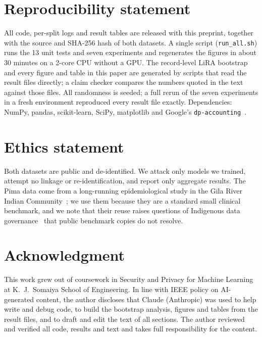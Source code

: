 \documentclass[conference]{IEEEtran}
\begin{document}
\section*{Reproducibility statement}
All code, per-split logs and result tables are released with this preprint, together with the source and SHA-256 hash of both datasets. A single script (\texttt{run\_all.sh}) runs the 13 unit tests and seven experiments and regenerates the figures in about 30 minutes on a 2-core CPU without a GPU. The record-level LiRA bootstrap and every figure and table in this paper are generated by scripts that read the result files directly; a claim checker compares the numbers quoted in the text against those files. All randomness is seeded; a full rerun of the seven experiments in a fresh environment reproduced every result file exactly. Dependencies: NumPy, pandas, scikit-learn, SciPy, matplotlib and Google's \texttt{dp-accounting}~\cite{dpaccounting}.

\section*{Ethics statement}
Both datasets are public and de-identified. We attack only models we trained, attempt no linkage or re-identification, and report only aggregate results. The Pima data come from a long-running epidemiological study in the Gila River Indian Community~\cite{radin2017}; we use them because they are a standard small clinical benchmark, and we note that their reuse raises questions of Indigenous data governance~\cite{carroll2020} that public benchmark copies do not resolve.

\section*{Acknowledgment}
This work grew out of coursework in Security and Privacy for Machine Learning at K.~J.~Somaiya School of Engineering. In line with IEEE policy on AI-generated content, the author discloses that Claude (Anthropic) was used to help write and debug code, to build the bootstrap analysis, figures and tables from the result files, and to draft and edit the text of all sections. The author reviewed and verified all code, results and text and takes full responsibility for the content.



\end{document}
